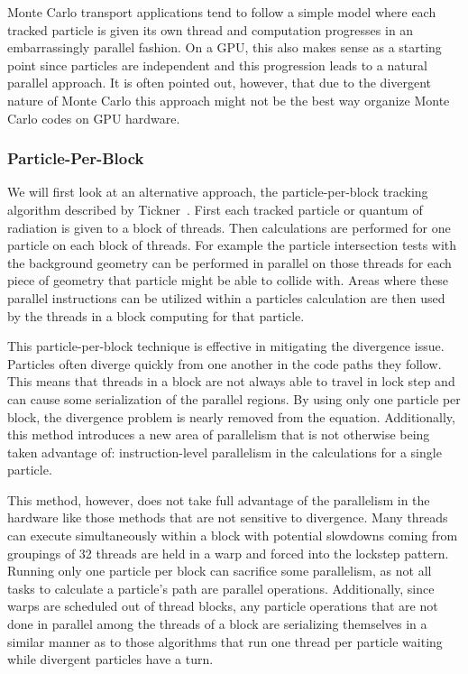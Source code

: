 %
Monte Carlo transport applications tend to follow a simple model where each tracked particle is given its own thread and computation progresses in an embarrassingly parallel fashion. 
%
On a GPU, this also makes sense as a starting point since particles are independent and this progression leads to a natural parallel approach.
%
It is often pointed out, however, that due to the divergent nature of Monte Carlo this approach might not be the best way organize Monte Carlo codes on GPU hardware.
%

\subsubsection*{\textbf{Particle-Per-Block}}
We will first look at an alternative approach, the particle-per-block tracking algorithm described by Tickner~\cite{tickner2010monte}.
%
First each tracked particle or quantum of radiation is given to a block of threads.
%
Then calculations are performed for one particle on each block of threads.
%
For example the particle intersection tests with the background geometry can be performed in parallel on those threads for each piece of geometry that particle might be able to collide with.
%
Areas where these parallel instructions can be utilized within a particles calculation are then used by the threads in a block computing for that particle.
%

This particle-per-block technique is effective in mitigating the divergence issue.
%
Particles often diverge quickly from one another in the code paths they follow.
%
This means that threads in a block are not always able to travel in lock step and can cause some serialization of the parallel regions.
%
By using only one particle per block, the divergence problem is nearly removed from the equation.
%
Additionally, this method introduces a new area of parallelism that is not otherwise being taken advantage of: instruction-level parallelism in the calculations for a single particle.
%

%
This method, however, does not take full advantage of the parallelism in the hardware like those methods that are not sensitive to divergence.
%
Many threads can execute simultaneously within a block with potential slowdowns coming from groupings of 32 threads are held in a warp and forced into the lockstep pattern.
%
Running only one particle per block can sacrifice some parallelism, as not all tasks to calculate a particle's path are parallel operations.
%
Additionally, since warps are scheduled out of thread blocks, any particle operations that are not done in parallel among the threads of a block are serializing themselves in a similar manner as to those algorithms that run one thread per particle waiting while divergent particles have a turn.
%

